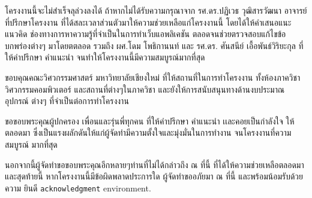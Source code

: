 \begin{acknowledgments}

    โครงงานนี้จะไม่สําเร็จลุล่วงลงได้ ถ้าหากไม่ได้รับความกรุณาจาก รศ.ดร.ปฏิเวธ วุฒิสารวัฒนา อาจารย์ที่ปรึกษาโครงงาน ที่ได้สละเวลาส่วนตัวมาให้ความช่วยเหลือแก่โครงงานนี้ โดยได้ให้คําเสนอแนะ แนวคิด ช่องทางการหาความรู้ที่จําเป็นในการทําเว็บแอพลิเคชัน 
    ตลอดจนช่วยตรวจสอบแก้ไขข้อบกพร่องต่างๆ มาโดยตตลอด รวมถึง ผศ.โดม โพธิกานนท์ และ รศ.ดร. ศันสนีย์ เอื้อพันธ์วิริยะกุล ที่ให้คําปรึกษา คําแนะนํา 
    จนทําให้โครงงานนี้มีความสมบูรณ์มากที่สุด
    
    ขอบคุณคณะวิศวกรรมศาสตร์ มหาวิทยาลัยเชียงใหม่ ที่ให้สถานที่ในการทําโครงงาน ทั้งห้องภาควิชา
    วิศวกรรมคอมพิวเตอร์ และสถานที่ต่างๆในภาควิชา และยังให้การสนับสนุนทางด้านงบประมาณ อุปกรณ์
    ต่างๆ ที่จําเป็นต่อการทําโครงงาน
    
    ขอขอบพระคุณผู้ปกครอง เพื่อนและรุ่นพี่ทุกคน ที่ให้คําปรึกษา คําแนะนํา เเละคอยเป็นกําลังใจ
    ให้ตลอดมา ซึ่งเป็นแรงผลักดันให้แก่ผู้จัดทํามีความตั้งใจและมุ่งมั่นในการทํางาน จนโครงงานที่ความสมบูรณ์
    มากที่สุด
    
    นอกจากนี้ผู้จัดทําขอขอบพระคุณอีกหลายๆท่านที่ไม่ได้กล่าวถึง ณ ที่นี้ ที่ได้ให้ความช่วยเหลือตลอดมา
    และสุดท้ายนี้ หากโครงงานนี้มีข้อผิดพลาดประการใด ผู้จัดทําขออภัยมา ณ ที่นี้ และพร้อมน้อมรับด้วยความ
    ยินดี
\texttt{acknowledgment} environment.

\end{acknowledgments}%
\fi %

\contentspage

\ifproject
\figurelistpage

\tablelistpage
\fi %



